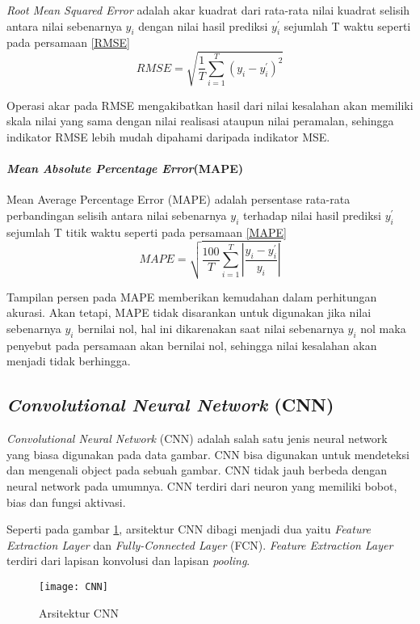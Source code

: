 \documentclass[../thesis.tex]{subfiles}
\begin{document}
\textit{Root Mean Squared Error} adalah akar kuadrat dari rata-rata nilai kuadrat selisih antara nilai sebenarnya $y_i$ dengan nilai hasil prediksi $y^{'}_i$ sejumlah T waktu seperti pada persamaan \ref{RMSE}
\begin{equation}\label{RMSE}
	RMSE = \sqrt{\frac {1}{T}\sum \limits_{i=1}^{T} {(y_i - y^{'}_i)^2}}
\end{equation}

Operasi akar pada RMSE mengakibatkan hasil dari nilai kesalahan akan memiliki skala nilai yang sama dengan nilai realisasi ataupun nilai peramalan, sehingga
indikator RMSE lebih mudah dipahami daripada indikator MSE. 

\paragraph{\textit{Mean Absolute Percentage Error}(MAPE)}

Mean Average Percentage Error (MAPE) adalah persentase rata-rata perbandingan selisih antara nilai sebenarnya $y_i$ terhadap nilai hasil prediksi $y^{'}_i$ sejumlah T
titik waktu seperti pada persamaan \ref{MAPE}
\begin{equation}\label{MAPE}
	MAPE = \sqrt{\frac {100}{T}\sum \limits_{i=1}^{T} {\left|{\frac {y_i - y^{'}_i}{y_i}}\right|}}
\end{equation}

Tampilan persen pada MAPE memberikan kemudahan dalam perhitungan akurasi. Akan tetapi, MAPE tidak disarankan untuk digunakan jika nilai sebenarnya $y_i$
bernilai nol, hal ini dikarenakan saat nilai sebenarnya $y_i$ nol maka penyebut pada persamaan akan bernilai nol, sehingga nilai kesalahan akan menjadi tidak berhingga.

\subsection{\textit{Convolutional Neural Network} (CNN)}

\textit{Convolutional Neural Network} (CNN) adalah salah satu jenis neural network yang biasa digunakan pada data gambar. CNN bisa digunakan untuk mendeteksi dan mengenali object pada sebuah gambar.
CNN tidak jauh berbeda dengan neural network pada umumnya. CNN terdiri dari neuron yang memiliki bobot, bias dan fungsi aktivasi.

Seperti pada gambar \ref{arsi_CNN}, arsitektur CNN dibagi menjadi dua yaitu \textit{Feature Extraction Layer} dan \textit{Fully-Connected Layer} (FCN). \textit{Feature Extraction Layer} terdiri dari lapisan konvolusi dan lapisan \textit{pooling}.
\begin{figure}
	\centering
	\texttt{[image: CNN]}
	\caption{Arsitektur CNN}
	\label{arsi_CNN}
\end{figure}
\end{document}
